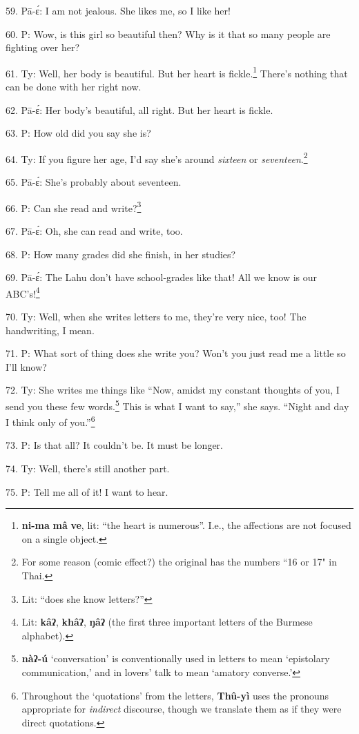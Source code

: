59. Pā-ɛ́: I am not jealous. She likes me, so I like her!

60. P: Wow, is this girl so beautiful then? Why is it that so many people
are fighting over her?

61. Ty: Well, her body is beautiful. But her heart is fickle.\footnote{\textbf{ni-ma} \textbf{mâ} \textbf{ve}, lit: ``the heart is numerous''. I.e., the affections are not focused on a single object.} There's
nothing that can be done with her right now.

62. Pā-ɛ́: Her body's beautiful, all right. But her heart is fickle.

63. P: How old did you say she is?

64. Ty: If you figure her age, I'd say she's around \textit{sixteen} or \textit{seventeen}.\footnote{For some reason (comic effect?) the original has the numbers ``16 or 17" in Thai.}

65. Pā-ɛ́: She's probably about seventeen.

66. P: Can she read and write?\footnote{Lit: ``does she know letters?''}

67. Pā-ɛ́: Oh, she can read and write, too.

68. P: How many grades did she finish, in her studies?

69. Pā-ɛ́: The Lahu don't have school-grades like that! All we know is our ABC's!\footnote{Lit: \textbf{kâʔ}, \textbf{khâʔ}, \textbf{ŋâʔ} (the first three important letters of the Burmese alphabet).}

70. Ty: Well, when she writes letters to me, they're very nice, too! The handwriting,
I mean.

71. P: What sort of thing does she write you? Won't you just read me a little
so I'll know?

72. Ty: She writes me things like ``Now, amidst my constant thoughts
of you, I send you these few words.\footnote{\textbf{nàʔ-ú} `conversation' is conventionally used in letters to mean `epistolary communication,' and in lovers' talk to mean `amatory converse.'} This is what I want to say,'' she says.
``Night and day I think only of you.''\footnote{Throughout the `quotations' from the letters, \textbf{Thû-yì} uses the pronouns appropriate for\textit{ indirect }discourse, though we translate them as if they were direct quotations.}

73. P: Is that all? It couldn't be. It must be longer.

74. Ty: Well, there's still another part.

75. P: Tell me all of it! I want to hear.

